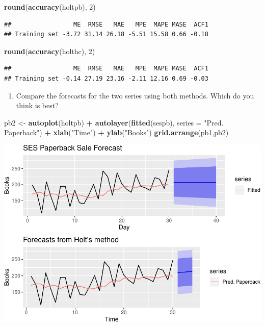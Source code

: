 \documentclass[]{article}
\newenvironment{Shaded}{\begin{snugshade}}{\end{snugshade}}
\newcommand{\KeywordTok}[1]{\textcolor[rgb]{0.13,0.29,0.53}{\textbf{#1}}}
\newcommand{\DataTypeTok}[1]{\textcolor[rgb]{0.13,0.29,0.53}{#1}}
\newcommand{\DecValTok}[1]{\textcolor[rgb]{0.00,0.00,0.81}{#1}}
\newcommand{\StringTok}[1]{\textcolor[rgb]{0.31,0.60,0.02}{#1}}
\newcommand{\OperatorTok}[1]{\textcolor[rgb]{0.81,0.36,0.00}{\textbf{#1}}}
\newcommand{\NormalTok}[1]{#1}
\providecommand{\tightlist}{%
  \setlength{\itemsep}{0pt}\setlength{\parskip}{0pt}}
\begin{document}
\begin{Shaded}
\begin{Highlighting}[]
\KeywordTok{round}\NormalTok{(}\KeywordTok{accuracy}\NormalTok{(holtpb), }\DecValTok{2}\NormalTok{)}
\end{Highlighting}
\end{Shaded}

\begin{verbatim}
##                 ME  RMSE   MAE   MPE  MAPE MASE  ACF1
## Training set -3.72 31.14 26.18 -5.51 15.58 0.66 -0.18
\end{verbatim}

\begin{Shaded}
\begin{Highlighting}[]
\KeywordTok{round}\NormalTok{(}\KeywordTok{accuracy}\NormalTok{(holthc), }\DecValTok{2}\NormalTok{)}
\end{Highlighting}
\end{Shaded}

\begin{verbatim}
##                 ME  RMSE   MAE   MPE  MAPE MASE  ACF1
## Training set -0.14 27.19 23.16 -2.11 12.16 0.69 -0.03
\end{verbatim}

\begin{enumerate}
\def\labelenumi{\alph{enumi})}
\setcounter{enumi}{2}
\tightlist
\item
  Compare the forecasts for the two series using both methods. Which do
  you think is best?
\end{enumerate}

\begin{Shaded}
\begin{Highlighting}[]
\NormalTok{pb2 <-}\StringTok{ }\KeywordTok{autoplot}\NormalTok{(holtpb) }\OperatorTok{+}
\StringTok{  }\KeywordTok{autolayer}\NormalTok{(}\KeywordTok{fitted}\NormalTok{(sespb), }\DataTypeTok{series =} \StringTok{"Pred. Paperback"}\NormalTok{) }\OperatorTok{+}\StringTok{ }
\StringTok{  }\KeywordTok{xlab}\NormalTok{(}\StringTok{"Time"}\NormalTok{) }\OperatorTok{+}\StringTok{ }\KeywordTok{ylab}\NormalTok{(}\StringTok{"Books"}\NormalTok{)}
\KeywordTok{grid.arrange}\NormalTok{(pb1,pb2)}
\end{Highlighting}
\end{Shaded}

\includegraphics{Hw4_files/figure-latex/unnamed-chunk-13-1.pdf}
\end{document}
